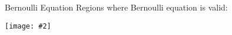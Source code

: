 \documentclass[12pt,aspectratio=169]{beamer}
\newcommand{\pic}[2]{\texttt{[image: \#2]}}
\newcommand{\eq}[2]{\vspace{#1}{\Large\begin{displaymath}#2\end{displaymath}}}
\begin{document}
%
%    
%
%
%
%
%
%
%



\begin{frame}{Bernoulli Equation}
  Regions where Bernoulli equation is valid:
  \begin{center}
    \pic{.8}{bernoulli}
  \end{center}
\end{frame}
\end{document}
